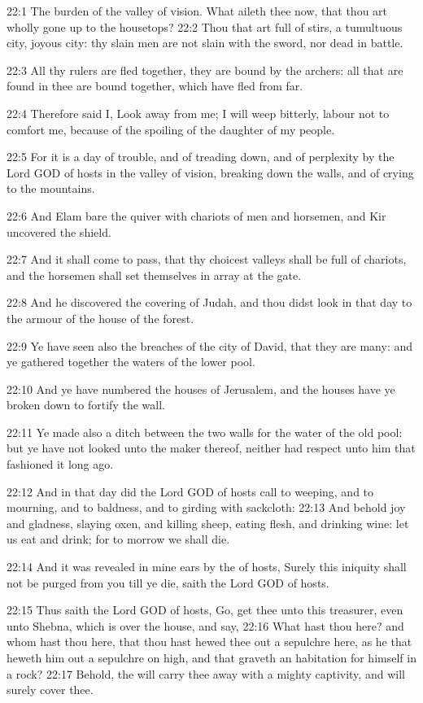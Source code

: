 22:1 The burden of the valley of vision. What aileth thee now, that thou art wholly gone up to the housetops?  22:2 Thou that art full of stirs, a tumultuous city, joyous city: thy slain men are not slain with the sword, nor dead in battle.

22:3 All thy rulers are fled together, they are bound by the archers: all that are found in thee are bound together, which have fled from far.

22:4 Therefore said I, Look away from me; I will weep bitterly, labour not to comfort me, because of the spoiling of the daughter of my people.

22:5 For it is a day of trouble, and of treading down, and of perplexity by the Lord GOD of hosts in the valley of vision, breaking down the walls, and of crying to the mountains.

22:6 And Elam bare the quiver with chariots of men and horsemen, and Kir uncovered the shield.

22:7 And it shall come to pass, that thy choicest valleys shall be full of chariots, and the horsemen shall set themselves in array at the gate.

22:8 And he discovered the covering of Judah, and thou didst look in that day to the armour of the house of the forest.

22:9 Ye have seen also the breaches of the city of David, that they are many: and ye gathered together the waters of the lower pool.

22:10 And ye have numbered the houses of Jerusalem, and the houses have ye broken down to fortify the wall.

22:11 Ye made also a ditch between the two walls for the water of the old pool: but ye have not looked unto the maker thereof, neither had respect unto him that fashioned it long ago.

22:12 And in that day did the Lord GOD of hosts call to weeping, and to mourning, and to baldness, and to girding with sackcloth: 22:13 And behold joy and gladness, slaying oxen, and killing sheep, eating flesh, and drinking wine: let us eat and drink; for to morrow we shall die.

22:14 And it was revealed in mine ears by the \LORD of hosts, Surely this iniquity shall not be purged from you till ye die, saith the Lord GOD of hosts.

22:15 Thus saith the Lord GOD of hosts, Go, get thee unto this treasurer, even unto Shebna, which is over the house, and say, 22:16 What hast thou here? and whom hast thou here, that thou hast hewed thee out a sepulchre here, as he that heweth him out a sepulchre on high, and that graveth an habitation for himself in a rock?  22:17 Behold, the \LORD will carry thee away with a mighty captivity, and will surely cover thee.


